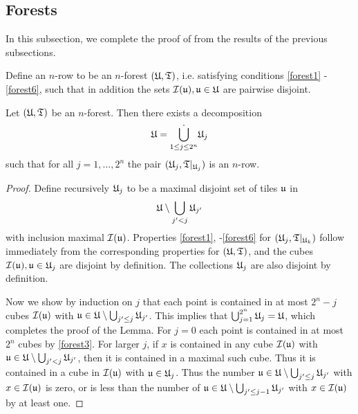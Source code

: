 \subsection{Forests}
In this subsection, we complete the proof of  from the results of the previous subsections.

Define an $n$-row to be an $n$-forest $({\mathfrak U}, {\mathfrak T})$, i.e. satisfying conditions \eqref{forest1} - \eqref{forest6}, such that in addition the sets ${\mathcal{I}}({\mathfrak u}), {\mathfrak u} \in {\mathfrak U}$ are pairwise disjoint.

\begin{lemma}
    \label{forest-row-decomposition}
    \leanok
    Let $({\mathfrak U}, {\mathfrak T})$ be an $n$-forest. Then there exists a decomposition
    $$
        {\mathfrak U} = \dot{\bigcup_{1 \le j \le 2^n}} {\mathfrak U}_j
    $$
    such that for all $j = 1, \dotsc, 2^n$ the pair $({\mathfrak U}_j, {\mathfrak T}|_{{\mathfrak U}_j})$ is an $n$-row.
\end{lemma}

\begin{proof}
    \leanok
    Define recursively ${\mathfrak U}_j$ to be a maximal disjoint set of tiles ${\mathfrak u}$ in
    $$
        {\mathfrak U} \setminus \bigcup_{j' < j} {\mathfrak U}_{j'}
    $$
    with inclusion maximal ${\mathcal{I}}({\mathfrak u})$. Properties \eqref{forest1}, -\eqref{forest6} for $({\mathfrak U}_j, {\mathfrak T}|_{{\mathfrak U}_k})$ follow immediately from the corresponding properties for $({\mathfrak U}, {\mathfrak T})$, and the cubes ${\mathcal{I}}({\mathfrak u}), {\mathfrak u} \in {\mathfrak U}_j$ are disjoint by definition. The collections ${\mathfrak U}_j$ are also disjoint by definition.

    Now we show by induction on $j$ that each point is contained in at most $2^n - j$ cubes ${\mathcal{I}}({\mathfrak u})$ with ${\mathfrak u} \in {\mathfrak U} \setminus \bigcup_{j' \le j} {\mathfrak U}_{j'}$. This implies that $\bigcup_{j = 1}^{2^n} {\mathfrak U}_j = {\mathfrak U}$, which completes the proof of the Lemma. For $j = 0$ each point is contained in at most $2^n$ cubes by \eqref{forest3}. For larger $j$, if $x$ is contained in any cube ${\mathcal{I}}({\mathfrak u})$ with ${\mathfrak u} \in {\mathfrak U} \setminus \bigcup_{j' < j} {\mathfrak U}_{j'}$, then it is contained in a maximal such cube. Thus it is contained in a cube in ${\mathcal{I}}({\mathfrak u})$ with ${\mathfrak u} \in {\mathfrak U}_j$. Thus the number ${\mathfrak u} \in {\mathfrak U} \setminus \bigcup_{j' \le j} {\mathfrak U}_{j'}$ with $x\in {\mathcal{I}}({\mathfrak u})$ is zero, or is less than the number of ${\mathfrak u} \in {\mathfrak U} \setminus \bigcup_{j' \le j-1} {\mathfrak U}_{j'}$ with $x \in {\mathcal{I}}({\mathfrak u})$ by at least one.
\end{proof}

